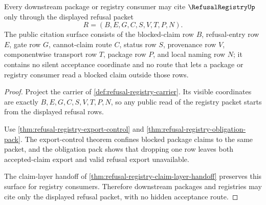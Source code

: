 \begin{theorem}
\label{thm:refusal-registry-public-export-surface}
Every downstream package or registry consumer may cite $\RefusalRegistryUp$ only through the displayed refusal packet
$$
R=(B,E,G,C,S,V,T,P,N).
$$
The public citation surface consists of the blocked-claim row $B$, refusal-entry row $E$, gate row $G$, cannot-claim route $C$, status row $S$, provenance row $V$, componentwise transport row $T$, package row $P$, and local naming row $N$; it contains no silent acceptance coordinate and no route that lets a package or registry consumer read a blocked claim outside those rows.
\end{theorem}
\begin{proof}
Project the carrier of \autoref{def:refusal-registry-carrier}. Its visible coordinates are exactly $B,E,G,C,S,V,T,P,N$, so any public read of the registry packet starts from the displayed refusal rows.

Use \autoref{thm:refusal-registry-export-control} and \autoref{thm:refusal-registry-obligation-pack}. The export-control theorem confines blocked package claims to the same packet, and the obligation pack shows that dropping one row leaves both accepted-claim export and valid refusal export unavailable.

The claim-layer handoff of \autoref{thm:refusal-registry-claim-layer-handoff} preserves this surface for registry consumers. Therefore downstream packages and registries may cite only the displayed refusal packet, with no hidden acceptance route.
\end{proof}

